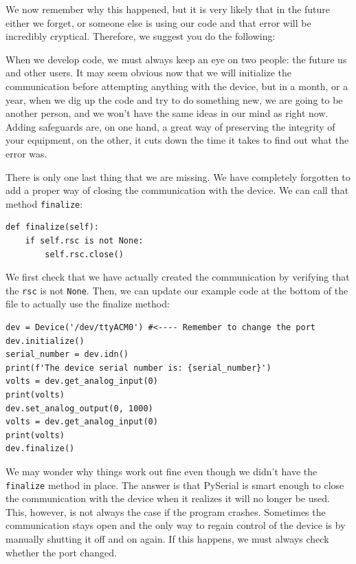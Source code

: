 We now remember why this happened, but it is very likely that in the future either we forget, or someone else is using our code and that error will be incredibly cryptical. Therefore, we suggest you do the following:


When we develop code, we must always keep an eye on two people: the future us and other users. It may seem obvious now that we will initialize the communication before attempting anything with the device, but in a month, or a year, when we dig up the code and try to do something new, we are going to be another person, and we won't have the same ideas in our mind as right now. Adding safeguards are, on one hand, a great way of preserving the integrity of your equipment, on the other, it cuts down the time it takes to find out what the error was.

There is only one last thing that we are missing. We have completely forgotten to add a proper way of closing the communication with the device. We can call that method \texttt{finalize}:

\begin{verbatim}
def finalize(self):
    if self.rsc is not None:
        self.rsc.close()
\end{verbatim}

We first check that we have actually created the communication by verifying that the \texttt{rsc} is not \texttt{None}. Then, we can update our example code at the bottom of the file to actually use the finalize method:

\begin{verbatim}
dev = Device('/dev/ttyACM0') #<---- Remember to change the port
dev.initialize()
serial_number = dev.idn()
print(f'The device serial number is: {serial_number}')
volts = dev.get_analog_input(0)
print(volts)
dev.set_analog_output(0, 1000)
volts = dev.get_analog_input(0)
print(volts)
dev.finalize()
\end{verbatim}

We may wonder why things work out fine even though we didn't have the \texttt{finalize} method in place. The answer is that PySerial is smart enough to close the communication with the device when it realizes it will no longer be used. This, however, is not always the case if the program crashes. Sometimes the communication stays open and the only way to regain control of the device is by manually shutting it off and on again. If this happens, we must always check whether the port changed.

